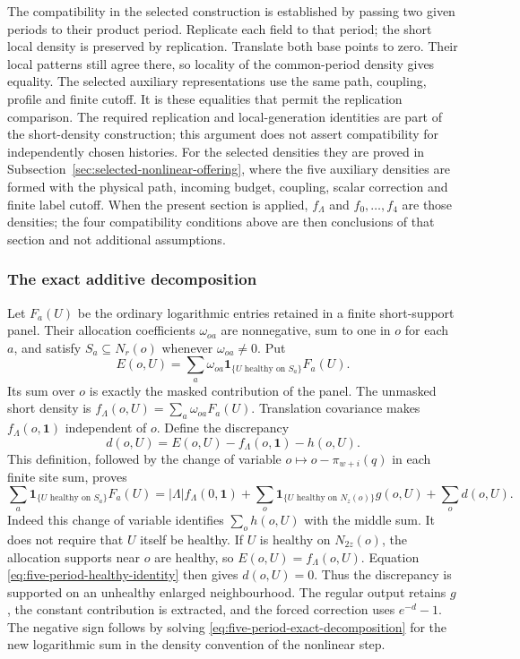 The compatibility in the selected construction is established by
passing two given periods to their product period. Replicate each
field to that period; the short local density is preserved by
replication. Translate both base points to zero. Their local
patterns still agree there, so locality of the common-period
density gives equality. The selected auxiliary representations
use the same path, coupling, profile and finite cutoff. It is
these equalities that permit the replication comparison. The
required replication and local-generation identities are part of
the short-density construction; this argument does not assert
compatibility for independently chosen histories. For the selected
densities they are proved in
Subsection~\ref{sec:selected-nonlinear-offering}, where the five
auxiliary densities are formed with the physical path, incoming
budget, coupling, scalar correction and finite label cutoff. When the
present section is applied, $f_\Lambda$ and $f_0,\ldots,f_4$ are
those densities; the four compatibility conditions above are then
conclusions of that section and not additional assumptions.

\subsubsection{The exact additive decomposition}
Let $F_a(U)$ be the ordinary logarithmic entries retained in a
finite short-support panel. Their allocation coefficients
$\omega_{oa}$ are nonnegative, sum to one in $o$ for each $a$,
and satisfy $S_a\subseteq N_r(o)$ whenever $\omega_{oa}\ne0$. Put
\[
 E(o,U)=\sum_a\omega_{oa}
           \mathbf1_{\{U\text{ healthy on }S_a\}}F_a(U).
\]
Its sum over $o$ is exactly the masked contribution of the panel.
The unmasked short density is
$f_\Lambda(o,U)=\sum_a\omega_{oa}F_a(U)$.
Translation covariance makes $f_\Lambda(o,\mathbf1)$ independent of
$o$.
Define the discrepancy
\[
                     d(o,U)=E(o,U)-f_\Lambda(o,\mathbf1)-h(o,U).
\]
This definition, followed by the change of variable
$o\mapsto o-\pi_{w+i}(q)$ in each finite site sum, proves
\begin{equation}\label{eq:five-period-exact-decomposition}
 \sum_a\mathbf1_{\{U\text{ healthy on }S_a\}}F_a(U)
 =|\Lambda|f_\Lambda(0,\mathbf1)
   +\sum_o\mathbf1_{\{U\text{ healthy on }N_z(o)\}}g(o,U)
   +\sum_o d(o,U).
\end{equation}
Indeed this change of variable identifies $\sum_oh(o,U)$ with
the middle sum. It does not require that $U$ itself be healthy.
If $U$ is healthy on $N_{2z}(o)$, the allocation supports near
$o$ are healthy, so $E(o,U)=f_\Lambda(o,U)$. Equation
\eqref{eq:five-period-healthy-identity} then gives $d(o,U)=0$.
Thus the discrepancy is supported on an unhealthy enlarged
neighbourhood. The regular output retains $g$, the constant
contribution is extracted, and the forced correction uses
$e^{-d}-1$. The negative sign follows by solving
\eqref{eq:five-period-exact-decomposition} for the new logarithmic
sum in the density convention of the nonlinear step.

